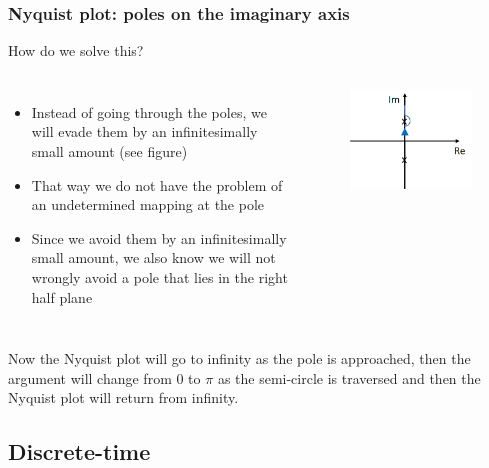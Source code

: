 \begin{frame}
	\frametitle{Nyquist plot: poles on the imaginary axis}
	How do we solve this?
	\begin{columns}
		\begin{itemize}
			\item Instead of going through the poles, we will evade them by an infinitesimally small amount (see figure)
			\item That way we do not have the problem of an undetermined mapping at the pole
			\item Since we avoid them by an infinitesimally small amount, we also know we will not wrongly avoid a pole that lies in the right half plane
		\end{itemize}
		\begin{figure}
			\includegraphics[width=1\linewidth]{avoid_pole}
		\end{figure}
	\end{columns}
	Now the Nyquist plot will go to infinity as the pole is approached, then the argument will change from 0 to $\pi$ as the semi-circle is traversed and then the Nyquist plot will return from infinity.
\end{frame}

\subsection{Discrete-time}

